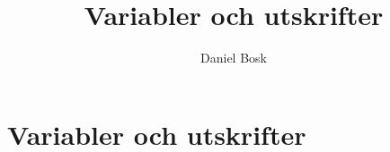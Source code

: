 \documentclass[a4paper,10pt,oneside,openright,
               oldfontcommands]{memoir}
\begin{document}
\title{%
  Variabler och utskrifter
}
\author{Daniel Bosk}

\maketitle

\begin{abstract}
  
\end{abstract}

\clearpage

\tableofcontents*

\chapter{Variabler och utskrifter}



\appendix


\printbibliography
\end{document}
